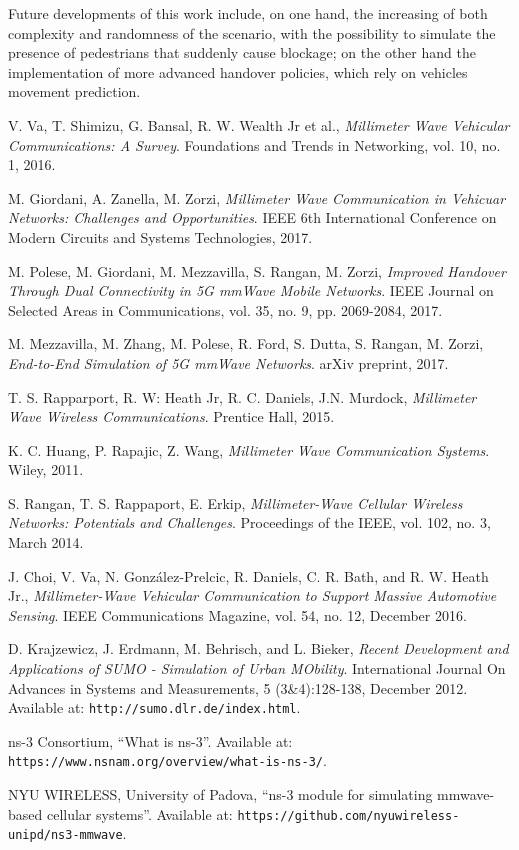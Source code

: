 \documentclass[conference,10pt]{IEEEtran}
\begin{document}
Future developments of this work include, on one hand, the increasing of both complexity and randomness of the scenario, with the possibility to simulate the presence of pedestrians that suddenly cause blockage; on the other hand the implementation of more advanced handover policies, which rely on vehicles movement prediction.


\begin{thebibliography}{15}
	
	V. Va, T. Shimizu, G. Bansal, R. W. Wealth Jr et al.,
	\emph{Millimeter Wave Vehicular Communications: A Survey}. 
	Foundations and Trends in Networking, vol. 10, no. 1, 2016.
	
	M. Giordani, A. Zanella, M. Zorzi,
	\emph{Millimeter Wave Communication in Vehicuar Networks: Challenges and Opportunities}. 
	IEEE 6th International Conference on Modern Circuits and Systems Technologies, 2017.
	
	M. Polese, M. Giordani, M. Mezzavilla, S. Rangan, M. Zorzi,
	\emph{Improved Handover Through Dual Connectivity in 5G mmWave Mobile Networks}. 
	IEEE Journal on Selected Areas in Communications, vol. 35, no. 9, pp. 2069-2084, 2017.
	
	M. Mezzavilla, M. Zhang, M. Polese, R. Ford, S. Dutta, S. Rangan, M. Zorzi,
	\emph{End-to-End Simulation of 5G mmWave Networks}. 
	arXiv preprint, 2017.
	
	T. S. Rapparport, R. W: Heath Jr, R. C. Daniels, J.N. Murdock,
	\emph{Millimeter Wave Wireless Communications}.
	Prentice Hall, 2015.
	
	K. C. Huang, P. Rapajic, Z. Wang,
	\emph{Millimeter Wave Communication Systems}.
	Wiley, 2011.
	
	S. Rangan, T. S. Rappaport, E. Erkip,
	\emph{Millimeter-Wave Cellular Wireless Networks: Potentials and Challenges}.
	Proceedings of the IEEE, vol. 102, no. 3, March 2014.
	
	J. Choi, V. Va, N. Gonz\'{a}lez-Prelcic, R. Daniels, C. R. Bath, and R. W. Heath Jr.,
	\emph{Millimeter-Wave Vehicular Communication to Support Massive Automotive Sensing}.
	IEEE Communications Magazine, vol. 54, no. 12, December 2016.
	
	D. Krajzewicz, J. Erdmann, M. Behrisch, and L. Bieker, \emph{Recent Development and Applications of SUMO - Simulation of Urban MObility}.
	International Journal On Advances in Systems and Measurements, 5 (3\&4):128-138, December 2012.
	Available at: \texttt{http://sumo.dlr.de/index.html}.
	
	ns-3 Consortium, “What is ns-3”. Available at: \texttt{https://www.nsnam.org/overview/what-is-ns-3/}.

	NYU WIRELESS, University of Padova, “ns-3 module for
	simulating mmwave-based cellular systems”. Available at:
	\texttt{https://github.com/nyuwireless-unipd/ns3-mmwave}.
	
\end{thebibliography}
\end{document}
